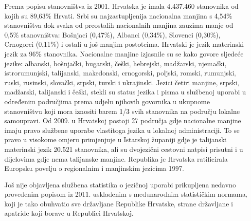 \begin{multicols}{2}
Prema popisu stanovništva iz 2001. Hrvatska je imala 4.437.460 stanovnika od kojih su 89,63\% Hrvati. Srbi su najzastupljenija nacionalna manjina s 4,54\% stanovništva dok svaka od preostalih nacionalnih manjina zauzima manje od 0,5\% stanovništva: Bošnjaci (0,47\%), Albanci (0,34\%), Slovenci (0,30\%), Crnogorci (0,11\%) i ostali u još manjim postotcima. Hrvatski je jezik materinski jezik za 96\% stanovnika. Nacionalne manjine izjasnile su se kako govore sljedeće jezike: albanski, bošnjački, bugarski, češki, hebrejski, madžarski, njemački, istrorumunjski, talijanski, makedonski, crnogorski, poljski, romski, rumunjski, ruski, rusinski, slovački, srpski, turski i ukrajinski. Jezici četiri manjine, srpski, madžarski, talijanski i češki, stekli su status jezika i pisma u službenoj uporabi u određenim područjima prema udjelu njihovih govornika u ukupnome stanovništvu koji mora iznositi barem 1/3 svih stanovnika na području lokalne samoupravi. Od 2009. u Hrvatskoj postoji 27 područja gdje nacionalne manjine imaju pravo službene uporabe vlastitoga jezika u lokalnoj administraciji. To se pravo u visokome omjeru primjenjuje u Istarskoj županiji gdje je talijanski materinski jezik 20.521 stanovnika, ali su dvojezični cestovni natpisi prisutni i u dijelovima gdje nema talijanske manjine. Republika je Hrvatska ratificirala Europsku povelju o regionalnim i manjinskim jezicima 1997.

Još nije objavljena službena statistika o jezičnoj uporabi prikupljena nedavno provedenim popisom iz 2011. usklađenim s međunarodnim statističkim normama, koji je tako obuhvatio sve državljane Republike Hrvatske, strane državljane i apatride koji borave u Republici Hrvatskoj.


\end{multicols}
